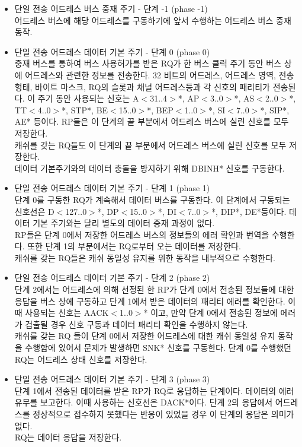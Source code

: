 \begin{itemize}
	\item 단일 전송 어드레스 버스 중재 주기 - 단계 -1 (phase -1)\\
	어드레스 버스에 해당 어드레스를 구동하기에 앞서 수행하는 어드레스 버스 중재 동작.
	\item 단일 전송 어드레스 데이터 기본 주기 - 단계 0 (phase 0)\\
	중재 버스를 통하여 버스 사용허가를 받은 RQ가 한 버스 클럭 주기 동안 
	버스 상에 어드레스와 관련한 정보를 전송한다.
	32 비트의 어드레스, 어드레스 영역, 전송 형태, 바이트 마스크, RQ의 슬롯과
 	채널 어드레스등과 각 신호의 패리티가 전송된다.
	이 주기 동안 사용되는 신호는 A$<$31..4$>$*, AP$<$3..0$>$*,
	AS$<$2..0$>$*, TT$<$4..0$>$*, STP*,
	BE$<$15..0$>$*, BEP$<$1..0$>$*,
	SI$<$7..0$>$*, SIP*, AE* 등이다.
	RP들은 이 단계의 끝 부분에서 어드레스 버스에 실린 신호를 모두 저장한다. \\
	캐쉬를 갖는 RQ들도 이 단계의 끝 부분에서 어드레스 버스에 실린 신호를 모두 저장한다. \\
	데이터 기본주기와의 데이터 충돌을 방지하기 위해 DBINH* 신호를 구동한다.
%
	\item 단일 전송 어드레스 데이터 기본 주기 - 단계 1 (phase 1)\\
	단계 0를 구동한 RQ가 계속해서 데이터 버스를 구동한다.
	이 단계에서 구동되는 신호선은 D$<$127..0$>$*,
	DP$<$15..0$>$*, DI$<$7..0$>$*, DIP*, DE*등이다.
	데이터 기본 주기와는 달리 별도의 데이터 중재 과정이 없다.\\
	RP들은 단계 0에서 저장한 어드레스 버스의 정보들의 에러 확인과 번역을 수행한다.
	또한 단계 1의 부분에서는 RQ로부터 오는 데이터를 저장한다. \\
	캐쉬를 갖는 RQ들은 캐쉬 동일성 유지를 위한 동작을 내부적으로 수행한다.
%
	\item 단일 전송 어드레스 데이터 기본 주기 - 단계 2 (phase 2)\\
	단계 2에서는 어드레스에 의해 선정된 한 RP가 단계 0에서 전송된 정보들에
	대한 응답을 버스 상에 구동하고 단계 1에서 받은 데이터의 패리티 에러를 확인한다.
	이때 사용되는 신호는 AACK$<$1..0$>$* 이고,
	만약 단계 0에서 전송된 정보에 에러가 검출될 경우 신호 구동과 데이터 패리티 확인을
	수행하지 않는다. \\
	캐쉬를 갖는 RQ 들이 단계 0에서 저장한 어드레스에 대한 
	캐쉬 동일성 유지 동작을 수행함에 있어서 문제가 발생하면 SNK* 신호를 구동한다.
	단계 0를 수행했던 RQ는 어드레스 상태 신호를 저장한다. \\
%
	\item 단일 전송 어드레스 데이터 기본 주기 - 단계 3 (phase 3)\\
	단계 1에서 전송된 데이터를 받은 RP가 RQ로 응답하는 단계이다.
	데이터의 에러 유무를 보고한다. 이때 사용하는 신호선은 DACK*이다.
	단계 2의 응답에서 어드레스를 정상적으로 접수하지 못했다는 반응이 있었을 경우
	이 단계의 응답은 의미가 없다. \\
	RQ는 데이터 응답을 저장한다. \\
\end{itemize}
%
